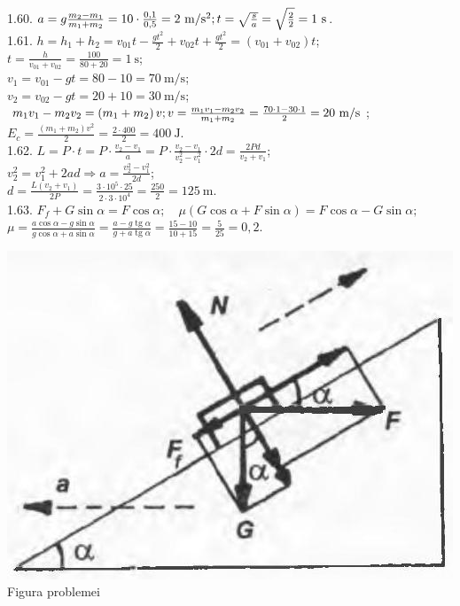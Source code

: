 1.60. $a=g \frac{m_{2}-m_{1}}{m_{1}+m_{2}}=10 \cdot \frac{0,1}{0,5}=2 \mathrm{~m} / \mathrm{s}^{2};\\ t=\sqrt{\frac{s}{a}}=\sqrt{\frac{2}{2}}=1 \mathrm{~s}$.\\

1.61. $h=h_{1}+h_{2}=v_{01} t-\frac{g t^{2}}{2}+v_{02} t+\frac{g t^{2}}{2}=\left(v_{01}+v_{02}\right)t$;\\ $t=\frac{h}{v_{01}+v_{02}}=\frac{100}{80+20}=1 \mathrm{~s}$;\\ $v_{1}=v_{01}-g t=80-10=70 \mathrm{~m} / \mathrm{s}$;\\ $v_{2}=v_{02}-g t=20+10=30 \mathrm{~m} / \mathrm{s}$;\\ $m_{1} v_{1}-m_{2} v_{2}=\left(m_{1}+m_{2}\right)v;\\ v=\frac{m_{1} v_{1}-m_{2} v_{2}}{m_{1}+m_{2}}=\frac{70 \cdot 1-30 \cdot 1}{2}=20 \mathrm{~m} / \mathrm{s}$;\\ $E_{c}=\frac{\left(m_{1}+m_{2}\right) v^{2}}{2}=\frac{2 \cdot 400}{2}=400 \mathrm{~J}$.\\

1.62. $L=P \cdot t=P \cdot \frac{v_{2}-v_{1}}{a}=P \cdot \frac{v_{2}-v_{1}}{v_{2}^{2}-v_{1}^{2}} \cdot 2 d=\frac{2 P d}{v_{2}+v_{1}}$;\\ $v_{2}^{2}=v_{1}^{2}+2 a d \Rightarrow a=\frac{v_{2}^{2}-v_{1}^{2}}{2 d}$;\\ $d=\frac{L\left(v_{2}+v_{1}\right)}{2 P}=\frac{3 \cdot 10^{5} \cdot 25}{2 \cdot 3 \cdot 10^{4}}=\frac{250}{2}=125 \mathrm{~m}$.\\

1.63. $F_{f}+G \sin \alpha=F \cos \alpha; \quad \mu(G \cos \alpha+F \sin \alpha)=F \cos \alpha-G \sin \alpha;$\\ $\mu=\frac{a \cos \alpha-g \sin \alpha}{g \cos \alpha+a \sin \alpha}=\frac{a-g \operatorname{tg} \alpha}{g+a \operatorname{tg} \alpha}=\frac{15-10}{10+15}=\frac{5}{25}=0,2$.\\ \begin{center} \includegraphics[width=0.4\linewidth]{images/2025_07_01_5b3ff9fa0d508c8e9f17g-211}\\ Figura problemei \end{center}\\

